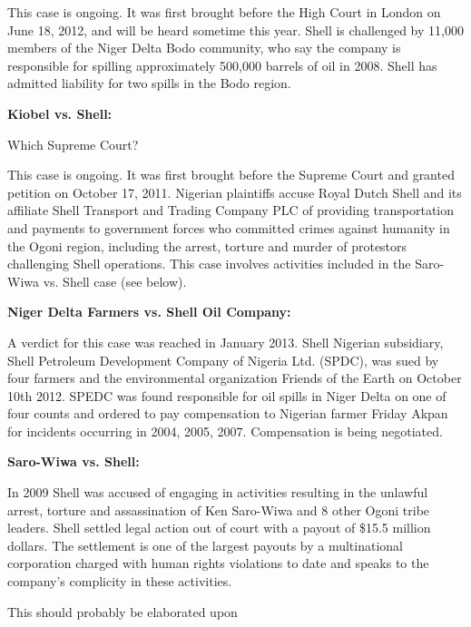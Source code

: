 This case is ongoing. 
It was first brought before the High Court in London on June 18, 2012, and will be heard sometime this year. 
Shell is challenged by 11,000 members of the Niger Delta Bodo community, who say the company is responsible for spilling approximately 500,000 barrels of oil in 2008. Shell has admitted liability for two spills in the Bodo region. 



\textbf{Kiobel vs. Shell:} 

\begin{vcom}
	Which Supreme Court?
\end{vcom}


This case is ongoing. 
It was first brought before the Supreme Court and granted petition on October 17, 2011. 
Nigerian plaintiffs accuse Royal Dutch Shell and its affiliate Shell Transport and Trading Company PLC of providing transportation and payments to government forces who committed crimes against humanity in the Ogoni region, including the arrest, torture and murder of protestors challenging Shell operations. 
This case involves activities included in the Saro-Wiwa vs. Shell case (see below).



\textbf{Niger Delta Farmers vs. Shell Oil Company:} 



A verdict for this case was reached in January 2013. 
Shell Nigerian subsidiary, Shell Petroleum Development Company of Nigeria Ltd. (SPDC), was sued by four farmers and the environmental organization Friends of the Earth on October 10th 2012. 
SPEDC was found responsible for oil spills in Niger Delta on one of four counts and ordered to pay compensation to Nigerian farmer Friday Akpan for incidents occurring in 2004, 2005, 2007. 
Compensation is being negotiated. 



\textbf{Saro-Wiwa vs. Shell:}



In 2009 Shell was accused of engaging in activities resulting in the unlawful arrest, torture and assassination of Ken Saro-Wiwa and 8 other Ogoni tribe leaders. 
Shell settled legal action out of court with a payout of \$15.5 million dollars. 
The settlement is one of the largest payouts by a multinational corporation charged with human rights violations to date and speaks to the company's complicity in these activities.

\begin{vcom}
	This should probably be elaborated upon
\end{vcom}


